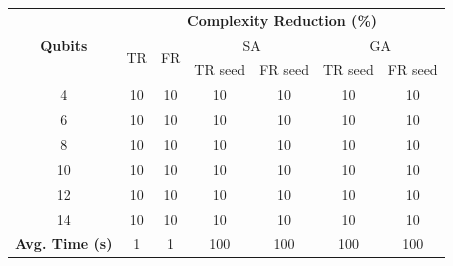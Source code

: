\begin{table}[]
\begin{tabular}{@{}ccccccc@{}}
\toprule
\multirow{3}{*}{\textbf{Qubits}}           & \multicolumn{6}{c}{\textbf{Complexity Reduction (\%)}}                                                      \\ \cmidrule(l){2-7}
                                           & \multirow{2}{*}{TR} & \multirow{2}{*}{FR} & \multicolumn{2}{c}{SA} & \multicolumn{2}{c}{GA} \\ \cmidrule(l){4-7}
                                           &                     &                     & TR seed    & FR seed   & TR seed    & FR seed   \\ \midrule
4                                          & 10                  & 10                  & 10         & 10        & 10         & 10        \\
6                                          & 10                  & 10                  & 10         & 10        & 10         & 10        \\
8                                          & 10                  & 10                  & 10         & 10        & 10         & 10        \\
10                                         & 10                  & 10                  & 10         & 10        & 10         & 10        \\
12                                         & 10                  & 10                  & 10         & 10        & 10         & 10        \\
14                                         & 10                  & 10                  & 10         & 10        & 10         & 10        \\ \midrule
\multicolumn{1}{l}{\textbf{Avg. Time (s)}} & 1                   & 1                   & 100        & 100       & 100        & 100       \\ \bottomrule
\end{tabular}
\end{table}
